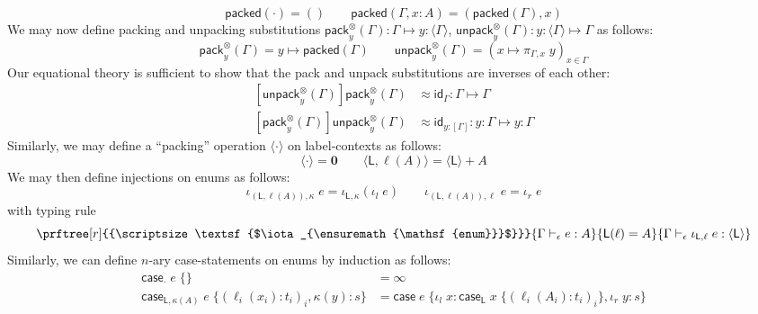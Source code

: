 \documentclass[acmsmall,screen,review]{acmart}
\newcommand{\mb}[1]{\ensuremath{\mathbf{#1}}}
\newcommand{\ms}[1]{\ensuremath{\mathsf{#1}}}
\newcommand{\lto}{:}
\newcommand{\linl}[1]{\iota_l\;{#1}}
\newcommand{\linr}[1]{\iota_r\;{#1}}
\newcommand{\casestmt}[5]{\ms{case}\;#1\;\{\linl{#2} \lto #3, \linr{#4} \lto #5\}}
\newcommand{\bhyp}[2]{#1 : #2}
\newcommand{\rle}[1]{{\scriptsize\textsf{#1}}}
\newcommand{\hasty}[4]{#1 \vdash_{#2} #3: {#4}}
\newcommand{\issubst}[3]{#1: #2 \mapsto #3}
\newcommand{\teqv}{\approx}
\newcommand{\pckd}[1]{\langle #1 \rangle}
\begin{document}
\begin{equation}
  \ms{packed}(\cdot) = () \qquad
  \ms{packed}(\Gamma, \bhyp{x}{A}) = (\ms{packed}(\Gamma), x)
\end{equation}
We may now define packing and unpacking substitutions
$\issubst{\ms{pack}_y^\otimes(\Gamma)}{\Gamma}{\bhyp{y}{\pckd{\Gamma}}}$,
$\issubst{\ms{unpack}_y^\otimes(\Gamma)}{\bhyp{y}{\pckd{\Gamma}}}{\Gamma}$ as follows:
\begin{equation}
  \ms{pack}_y^\otimes(\Gamma) = y \mapsto \ms{packed}(\Gamma) \qquad
  \ms{unpack}_y^\otimes(\Gamma) = (x \mapsto \pi_{\Gamma, x}\;y)_{x \in \Gamma}
\end{equation}
Our equational theory is sufficient to show that the pack and unpack substitutions are inverses of
each other:
\begin{equation}
  \begin{aligned}
  \issubst
    {[\ms{unpack}_y^\otimes(\Gamma)]\ms{pack}_y^\otimes(\Gamma) 
      &\teqv \ms{id}_{\Gamma}}{\Gamma}{\Gamma}
  \\
  \issubst
    {[\ms{pack}_y^\otimes(\Gamma)]\ms{unpack}_y^\otimes(\Gamma) &\teqv \ms{id}_{\bhyp{y}{[\Gamma]}}}
    {\bhyp{y}{\Gamma}}{\bhyp{y}{\Gamma}}
  \end{aligned}
\end{equation}
Similarly, we may define a ``packing'' operation $\pckd{\cdot}$ on label-contexts as follows:
\begin{equation}
  \pckd{\cdot} = \mb{0} \qquad \pckd{\ms{L}, \ell(A)} = \pckd{\ms{L}} + A
\end{equation}
We may then define injections on enums as follows:
\begin{equation}
  \iota_{(\ms{L}, \ell(A)), \kappa}\;e = \iota_{\ms{L}, \kappa}(\iota_l\;e) \qquad
  \iota_{(\ms{L}, \ell(A)), \ell}\;e = \iota_r\;e
\end{equation}
with typing rule
\begin{equation}
  \prftree[r]{\rle{$\iota_{\ms{enum}}$}}
    {\hasty{\Gamma}{\epsilon}{e}{A}}
    {\ms{L}(\ell) = A}
    {\hasty{\Gamma}{\epsilon}{\iota_{\ms{L}, \ell}\;e}{\pckd{\ms{L}}}}
\end{equation}
Similarly, we can define $n$-ary case-statements on enums by induction as follows:
\begin{equation}
  \begin{aligned}
  \ms{case}_\cdot\;e\;\{\} &= \infty \\
  \ms{case}_{\ms{L}, \kappa(A)}\;e\;\{(\ell_i(x_i): t_i)_i, \kappa(y): s\}
  &= \casestmt{e}{x}{\ms{case}_{\ms{L}}\;x\;\{(\ell_i(A_i): t_i)_i\}}{y}{s}
  \end{aligned}
\end{equation}
\end{document}
